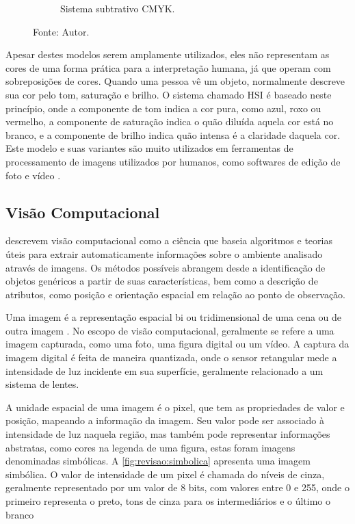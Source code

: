 \begin{figure}[htbp]
\begin{subfigure}[c]{0.45\textwidth}
        \caption{Sistema subtrativo \ac{CMYK}.}
        \label{fig:cores:cmyk}
    \end{subfigure}
    \hfill
    \caption*{Fonte: Autor.}
\end{figure}

Apesar destes modelos serem amplamente utilizados, eles não representam as cores de uma forma prática para a interpretação humana, já que operam com sobreposições de cores.
Quando uma pessoa vê um objeto, normalmente descreve sua cor pelo tom, saturação e brilho.
O sistema chamado \ac{HSI} é baseado neste princípio, onde a componente de tom indica a cor pura, como azul, roxo ou vermelho, a componente de saturação indica o quão diluída aquela cor está no branco, e a componente de brilho indica quão intensa é a claridade daquela cor.
Este modelo e suas variantes são muito utilizados em ferramentas de processamento de imagens utilizados por humanos, como softwares de edição de foto e vídeo \cite{gonzalez2008digital}.

\subsection{Visão Computacional}\label{ssec:visao}

\citeauthor{haralick1992computer} \cite{haralick1992computer} descrevem visão computacional como a ciência que baseia algoritmos e teorias úteis para extrair automaticamente informações sobre o ambiente analisado através de imagens.
Os métodos possíveis abrangem desde a identificação de objetos genéricos a partir de suas características, bem como a descrição de atributos, como posição e orientação espacial em relação ao ponto de observação.

Uma imagem é a representação espacial bi ou tridimensional de uma cena ou de outra imagem \cite{haralick1992computer}.
No escopo de visão computacional, geralmente se refere a uma imagem capturada, como uma foto, uma figura digital ou um vídeo.
A captura da imagem digital é feita de maneira quantizada, onde o sensor retangular mede a intensidade de luz incidente em sua superfície, geralmente relacionado a um sistema de lentes.

A unidade espacial de uma imagem é o \ac{pixel}, que tem as propriedades de valor e posição, mapeando a informação da imagem.
Seu valor pode ser associado à intensidade de luz naquela região, mas também pode representar informações abstratas, como cores na legenda de uma figura, estas foram imagens denominadas simbólicas.
A \autoref{fig:revisao:simbolica} apresenta uma imagem simbólica.
O valor de intensidade de um \ac{pixel} é chamada do níveis de cinza, geralmente representado por um valor de 8 bits, com valores entre 0 e 255, onde o primeiro representa o preto, tons de cinza para os intermediários e o último o branco

